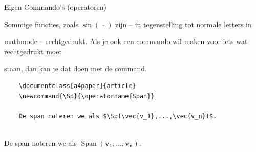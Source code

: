 \begin{frame}[fragile]{Eigen Commando's (operatoren)}

Sommige functies, zoals $\sin(\,\cdot\,)$ zijn -- in tegenstelling tot normale letters in 

mathmode -- rechtgedrukt. Als je ook een commando wil maken voor iets wat rechtgedrukt moet 

staan, dan kan je dat doen met de \texttt{\operatorname{}} command. 

\pause

\begin{verbatim}
    \documentclass[a4paper]{article}
    \newcommand{\Sp}{\operatorname{Span}}
    
    De span noteren we als $\Sp(\vec{v_1},...,\vec{v_n})$. 
    
\end{verbatim}
\pause

\newcommand{\Sp}{\operatorname{Span}}

\begin{tcolorbox}[boxrule=0.5pt, colback=white]

    De span noteren we als $\Sp(\mathbf{v_1},...,\mathbf{v_n})$. 

\end{tcolorbox}

\end{frame}